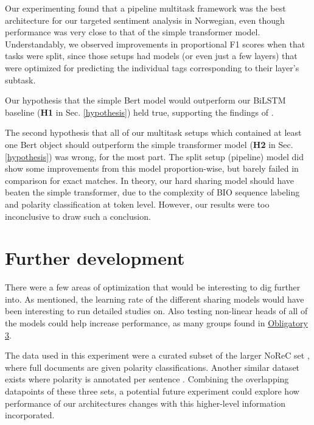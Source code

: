 \documentclass[11pt,a4paper]{article}
\begin{document}
Our experimenting found that a pipeline multitask framework was the best architecture for our targeted sentiment analysis in Norwegian, even though performance was very close to that of the simple transformer model.
Understandably, we observed improvements in proportional F1 scores when that tasks were split, since those setups had models (or even just a few layers) that were optimized for predicting the individual tags corresponding to their layer's subtask. 

Our hypothesis that the simple Bert model would outperform our BiLSTM baseline (\textbf{H1} in Sec. \ref{hypothesis}) held true, supporting the findings of \citealt{devlin-etal-2019-bert}.

The second hypothesis that all of our multitask setups which contained at least one Bert object should outperform the simple transformer model (\textbf{H2} in Sec. \ref{hypothesis}) was wrong, for the most part. The split setup (pipeline) model did show some improvements from this model proportion-wise, but barely failed in comparison for exact matches. In theory, our hard sharing model should have beaten the simple transformer, due to the complexity of BIO sequence labeling and polarity classification at token level. However, our results were too inconclusive to draw such a conclusion. 


\section{Further development}
There were a few areas of optimization that would be interesting to dig further into. As mentioned, the learning rate of the different sharing models would have been interesting to run detailed studies on. Also testing non-linear heads of all of the models could help increase performance, as many groups found in \href{https://github.uio.no/fabior/IN5550/tree/master/Oblig3}{Obligatory 3}. 

The data used in this experiment were a curated subset of the larger NoReC set \cite{NRC}, where full documents are given polarity classifications. Another similar dataset exists where polarity is annotated per sentence \cite{NRCEVAL}. Combining the overlapping datapoints of these three sets, a potential future experiment could explore how performance of our architectures changes with this higher-level information incorporated. 
\end{document}
